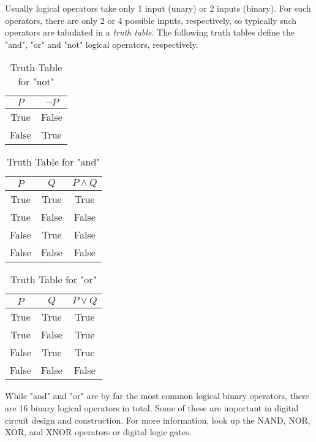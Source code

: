 Usually logical operators take only 1 input (unary) or 2 inputs (binary). For such operators,
there are only 2 or 4 possible inputs, respectively, so typically such operators are
tabulated in a \emph{truth table}. The following truth tables define the "and", "or"
and "not" logical operators, respectively.
\begin{table}[H]
  \centering
  \begin{tabular}{cc}
    \toprule
   \(P\) & \( \lnot P \)  \\
    \midrule
    True & False \\
    False & True \\
    \bottomrule
  \end{tabular}
  \caption{Truth Table for "not"}
\end{table}

\begin{table}[H]
  \centering
  \begin{tabular}{ccc}
    \toprule
    \(P\) & \(Q\) & \( P \land Q \)  \\
    \midrule
    True & True & True \\
    True & False & False \\
    False & True & False \\
    False & False & False \\
    \bottomrule
  \end{tabular}
  \caption{Truth Table for "and"}
\end{table}

\begin{table}[H]
  \centering
  \begin{tabular}{ccc}
    \toprule
    \(P\) & \(Q\) & \( P \lor Q \)  \\
    \midrule
    True & True & True \\
    True & False & True \\
    False & True & True \\
    False & False & False \\
    \bottomrule
  \end{tabular}
  \caption{Truth Table for "or"}
\end{table}

\begin{advancedTopic}
  While "and" and "or" are by far the most common logical binary operators,
  there are 16 binary logical operators in total. Some of these are important
  in digital circuit design and construction. For more information, look up
  the NAND, NOR, XOR, and XNOR operators or digital logic gates.
\end{advancedTopic}

